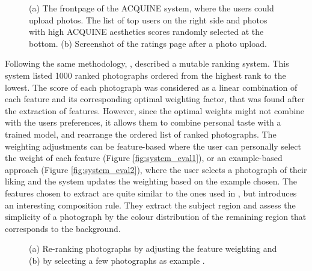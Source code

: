 \begin{figure}[htbp]
        \centering
  \caption{(a) The frontpage of the ACQUINE system, where the users could upload photos. The list of top users on the right side and photos with high ACQUINE aesthetics scores randomly selected at the bottom. (b) Screenshot of the ratings page after a photo upload. \cite{datta2010acquine}}
  \label{fig:acquine_image}
\end{figure}

Following the same methodology, \citeauthor{yeh2010personalized} \cite{yeh2010personalized}, described a mutable ranking system. This system listed 1000 ranked photographs ordered from the highest rank to the lowest. The score of each photograph was considered as a linear combination of each feature and its corresponding optimal weighting factor, that was found after the extraction of features. However, since the optimal weights might not combine with the users preferences, it allows them to combine personal taste with a trained model, and rearrange the ordered list of ranked photographs.
The weighting adjustments can be feature-based where the user can personally select the weight of each feature (Figure \ref{fig:system_eval1}), or an example-based approach (Figure \ref{fig:system_eval2}), where the user selects a photograph of their liking and the system updates the weighting based on the example chosen.
The features chosen to extract are quite similar to the ones used in \cite{datta2006studying}, but introduces an interesting composition rule. They extract the subject region and assess the simplicity of a photograph by the colour distribution of the remaining region that corresponds to the background.

\begin{figure}[htb]
    \centering
  \caption{(a) Re-ranking photographs by adjusting the feature weighting and (b) by selecting a few photographs as example \cite{yeh2010personalized}.}
  \label{fig:system_eval_image}
\end{figure}

